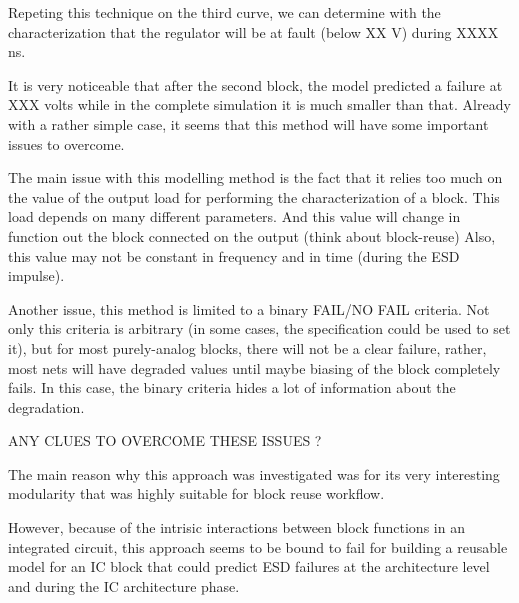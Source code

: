 Repeting this technique on the third curve, we can determine with the characterization that the regulator will be at
fault (below XX V) during XXXX ns.

It is very noticeable that after the second block, the model predicted a failure at
XXX volts while in the complete simulation it is much smaller than that.
Already with a rather simple case, it seems that this method will have some important issues to overcome.

The main issue with this modelling method is the fact that it relies too much
on the value of the output load for performing the characterization of a block.
This load depends on many different parameters.
And this value will change in function out the block connected on the output (think about block-reuse)
Also, this value may not be constant in frequency and in time (during the ESD impulse).

Another issue, this method is limited to a binary FAIL/NO FAIL criteria.
Not only this criteria is arbitrary (in some cases, the specification could be used to set it), but
for most purely-analog blocks, there will not be a clear failure, rather, most
nets will have degraded values until maybe biasing of the block completely fails.
In this case, the binary criteria hides a lot of information about the degradation.

ANY CLUES TO OVERCOME THESE ISSUES ?

The main reason why this approach was investigated was for its very interesting modularity
that was highly suitable for block reuse workflow.

However, because of the intrisic interactions between block functions in an integrated circuit,
this approach seems to be bound to fail for building a reusable model for an IC block that could predict
ESD failures at the architecture level and during the IC architecture phase.
